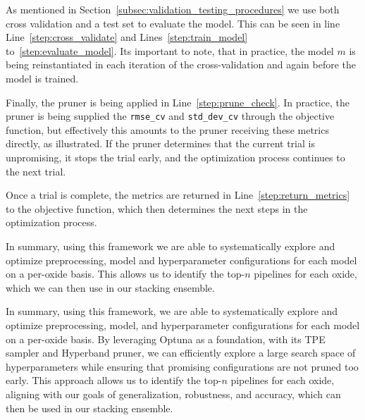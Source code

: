 As mentioned in Section~\ref{subsec:validation_testing_procedures} we use both cross validation and a test set to evaluate the model.
This can be seen in line Line~\ref{step:cross_validate} and Lines~\ref{step:train_model} to~\ref{step:evaluate_model}.
Its important to note, that in practice, the model $m$ is being reinstantiated in each iteration of the cross-validation and again before the model is trained.

Finally, the pruner is being applied in Line~\ref{step:prune_check}.
In practice, the pruner is being supplied the \texttt{rmse\_cv} and \texttt{std\_dev\_cv} through the objective function, but effectively this amounts to the pruner receiving these metrics directly, as illustrated.
If the pruner determines that the current trial is unpromising, it stops the trial early, and the optimization process continues to the next trial.

Once a trial is complete, the metrics are returned in Line~\ref{step:return_metrics} to the objective function, which then determines the next steps in the optimization process.

In summary, using this framework we are able to systematically explore and optimize preprocessing, model and hyperparameter configurations for each model on a per-oxide basis.
This allows us to identify the top-$n$ pipelines for each oxide, which we can then use in our stacking ensemble. 

In summary, using this framework, we are able to systematically explore and optimize preprocessing, model, and hyperparameter configurations for each model on a per-oxide basis. 
By leveraging Optuna as a foundation, with its TPE sampler and Hyperband pruner, we can efficiently explore a large search space of hyperparameters while ensuring that promising configurations are not pruned too early. 
This approach allows us to identify the top-$n$ pipelines for each oxide, aligning with our goals of generalization, robustness, and accuracy, which can then be used in our stacking ensemble.

